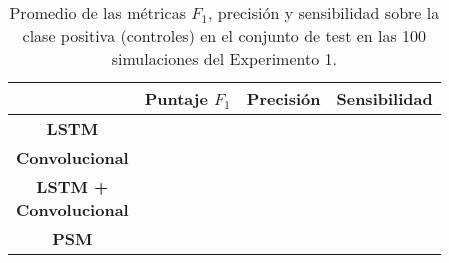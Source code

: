 \begin{table}[ht]
    \centering
    \renewcommand{\arraystretch}{1.2}
    \begin{tabular}{|c|c|c|c|}
        \hline
         & \textbf{Puntaje} \(F_1\) & \textbf{Precisión} & \textbf{Sensibilidad} \\ \hline\hline
        \textbf{LSTM}
            &  &  &  \\ \hline
        \textbf{Convolucional}
            &  &  &  \\ \hline
        \makecell{\textbf{LSTM +} \\ \textbf{Convolucional}}
            &  &  &  \\ \hline
        \textbf{PSM}
            & &  &  \\
        \hline
    \end{tabular}
    \caption{Promedio de las métricas \(F_1\), precisión y sensibilidad sobre la
    clase positiva (controles) en el conjunto de test en las 100 simulaciones del
    Experimento 1.}
    \label{tab:results_exp1}
\end{table}